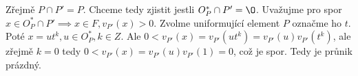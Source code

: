 \documentclass[12pt, a4paper]{article}
\begin{document}
Zřejmě $P \cap P' = P$. Chceme tedy zjistit jestli $O^*_P \cap P' = \O$. Uvažujme pro spor $x \in O^*_P \cap P' \implies x \in F, v_{P'}(x) > 0$. Zvolme uniformující element $P$ označme ho $t$. Poté $x = u t^k, u \in O^*_P, k \in Z$. Ale $0<v_{P'}(x) = v_{P'}(ut^k)=v_{P'}(u)v_{P'}(t^k)$, ale zřejmě $k = 0$ tedy $0<v_{P'}(x) = v_{P'}(u)v_{P'}(1)= 0$, což je spor. Tedy je průnik prázdný.
\end{document}

